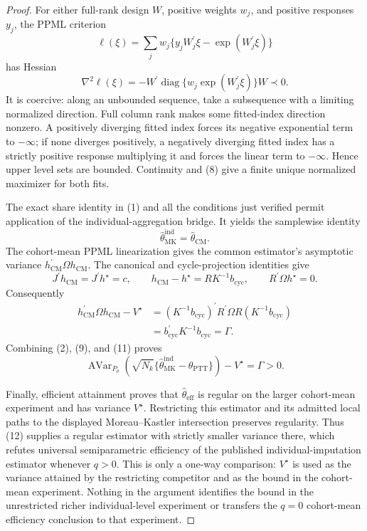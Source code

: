 \documentclass{article}
\begin{document}
\begin{proof}
For either full-rank design \(W\), positive weights \(w_j\), and positive responses \(y_j\), the PPML criterion
\[
\ell(\xi)=\sum_jw_j\{y_jW_j^{\prime}\xi-\exp(W_j^{\prime}\xi)\}     \tag{7}
\]
has Hessian
\[
\nabla^2\ell(\xi)
=-W^{\prime}\operatorname{diag}\{w_j\exp(W_j^{\prime}\xi)\}W\prec0. \tag{8}
\]
It is coercive: along an unbounded sequence, take a subsequence with a limiting normalized direction.  Full column rank makes some fitted-index direction nonzero.  A positively diverging fitted index forces its negative exponential term to \(-\infty\); if none diverges positively, a negatively diverging fitted index has a strictly positive response multiplying it and forces the linear term to \(-\infty\).  Hence upper level sets are bounded.  Continuity and (8) give a finite unique normalized maximizer for both fits.

The exact share identity in (1) and all the conditions just verified permit application of the individual-aggregation bridge.  It yields the samplewise identity
\[
\widehat\theta_{\mathrm{MK}}^{\mathrm{ind}}
=\widehat\theta_{\mathrm{CM}}.                                         \tag{9}
\]
The cohort-mean PPML linearization gives the common estimator's asymptotic variance
\(h_{\mathrm{CM}}^{\prime}\Omega h_{\mathrm{CM}}\).  The canonical and cycle-projection identities give
\[
J^{\prime}h_{\mathrm{CM}}=J^{\prime}h^{\star}=c,
\qquad
h_{\mathrm{CM}}-h^{\star}=RK^{-1}b_{\mathrm{cyc}},
\qquad
R^{\prime}\Omega h^{\star}=0.                                         \tag{10}
\]
Consequently
\[
\begin{aligned}
h_{\mathrm{CM}}^{\prime}\Omega h_{\mathrm{CM}}-V^{\star}
&=(K^{-1}b_{\mathrm{cyc}})^{\prime}
 R^{\prime}\Omega R(K^{-1}b_{\mathrm{cyc}})\\
&=b_{\mathrm{cyc}}^{\prime}K^{-1}b_{\mathrm{cyc}}
=\Gamma.                                                               \tag{11}
\end{aligned}
\]
Combining (2), (9), and (11) proves
\[
\operatorname{AVar}_{P_\rho}\!\left(
\sqrt{N_k}\{\widehat\theta_{\mathrm{MK}}^{\mathrm{ind}}
-\theta_{\mathrm{PTT}}\}\right)-V^{\star}
=\Gamma>0.                                                              \tag{12}
\]

Finally, efficient attainment proves that
\(\widehat\theta_{\mathrm{eff}}\) is regular on the larger cohort-mean experiment and has variance \(V^{\star}\).  Restricting this estimator and its admitted local paths to the displayed Moreau--Kastler intersection preserves regularity.  Thus (12) supplies a regular estimator with strictly smaller variance there, which refutes universal semiparametric efficiency of the published individual-imputation estimator whenever \(q>0\).  This is only a one-way comparison: \(V^{\star}\) is used as the variance attained by the restricting competitor and as the bound in the cohort-mean experiment.  Nothing in the argument identifies the bound in the unrestricted richer individual-level experiment or transfers the \(q=0\) cohort-mean efficiency conclusion to that experiment.
\end{proof}
\end{document}

